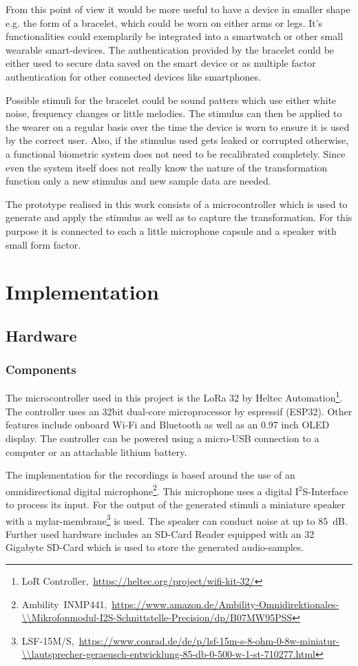 From this point of view it would be more useful to have a device in smaller shape e.g. the form of a bracelet, which could be worn on either arms or legs.
It's functionalities could exemplarily be integrated into a smartwatch or other small wearable smart-devices. 
The authentication provided by the bracelet could be either used to secure data saved on the smart device or as multiple factor authentication for other connected devices like smartphones.

Possible stimuli for the bracelet could be sound patters which use either white noise, frequency changes or little melodies.
The stimulus can then be applied to the wearer on a regular basis over the time the device is worn to ensure it is used by the correct user.
Also, if the stimulus used gets leaked or corrupted otherwise, a functional biometric system does not need to be recalibrated completely.
Since even the system itself does not really know the nature of the transformation function only a new stimulus and new sample data are needed.

The prototype realised in this work consists of a microcontroller which is used to generate and apply the stimulus as well as to capture the transformation.
For this purpose it is connected to each a little microphone capsule and a speaker with small form factor.

\section{Implementation}
\subsection{Hardware}
\subsubsection{Components}
The microcontroller used in this project is the LoRa 32 by Heltec Automation\footnote{LoR Controller,~\url{https://heltec.org/project/wifi-kit-32/}}.
The controller uses an 32bit dual-core microprocessor by espressif (ESP32).
Other features include onboard Wi-Fi and Bluetooth as well as an 0.97 inch OLED display.
The controller can be powered using a micro-USB connection to a computer or an attachable lithium battery.

The implementation for the recordings is based around the use of an omnidirectional digital microphone\footnote{Ambility~INMP441,~\url{https://www.amazon.de/Ambility-Omnidirektionales-\\Mikrofonmodul-I2S-Schnittstelle-Precision/dp/B07MW95PSS}}.
This microphone uses a digital I$^{2}$S-Interface to process its input. 
For the output of the generated stimuli a miniature speaker with a mylar-membrane\footnote{LSF-15M/S,~\url{https://www.conrad.de/de/p/lsf-15m-s-8-ohm-0-8w-miniatur-\\lautsprecher-geraeusch-entwicklung-85-db-0-500-w-1-st-710277.html}} is used.
The speaker can conduct noise at up to 85~dB.
Further used hardware includes an SD-Card Reader equipped with an 32 Gigabyte SD-Card which is used to store the generated audio-samples.

